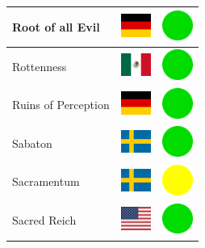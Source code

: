 \documentclass[12pt, a4paper, twoside]{report}
\begin{document}
\begin{center}
\begin{longtable}{|p{5cm}|p{2cm}|p{2cm}|}
Root of all Evil & \includegraphics[width=1cm]{4x3/de} & \includegraphics[width=1cm]{likes/y} \\ \hline
Rottenness & \includegraphics[width=1cm]{4x3/mx} & \includegraphics[width=1cm]{likes/y} \\ \hline
Ruins of Perception & \includegraphics[width=1cm]{4x3/de} & \includegraphics[width=1cm]{likes/y} \\ \hline
Sabaton & \includegraphics[width=1cm]{4x3/se} & \includegraphics[width=1cm]{likes/y} \\ \hline
Sacramentum﻿ & \includegraphics[width=1cm]{4x3/se} & \includegraphics[width=1cm]{likes/m} \\ \hline
Sacred Reich & \includegraphics[width=1cm]{4x3/us} & \includegraphics[width=1cm]{likes/y} \\ \hline

\end{longtable}
\end{center}
\end{document}
